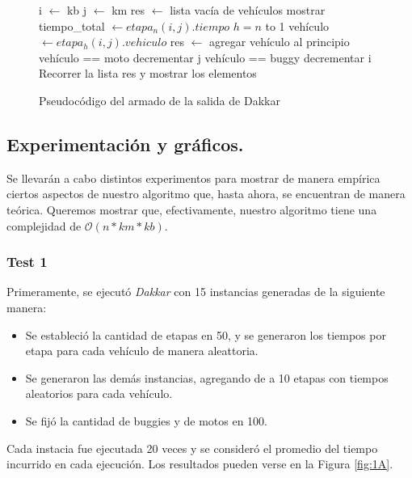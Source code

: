 \begin{figure}[!ht]
\begin{codebox}
\li i $\leftarrow$ kb
\li j $\leftarrow$ km
\li res $\leftarrow$ lista vacía de vehículos
\li mostrar tiempo_total $\leftarrow etapa_n(i,j).tiempo$
\li \For $h = n$ to 1
\li 		\Do 
			vehículo $\leftarrow etapa_h(i,j).vehiculo$
\li			res $\leftarrow$ agregar vehículo al principio
\li			\If vehículo == moto
\li				\Do decrementar j
\li 			\Else \If vehículo == buggy
\li					\Do decrementar i
					\End
			\End
		\End
\li Recorrer la lista res y mostrar los elementos
\end{codebox} 
\caption{Pseudocódigo del armado de la salida de Dakkar}\label{code:dakkar.salida}
\end{figure}

\vspace*{0.6cm}
\subsection{Experimentación y gráficos.}

\vspace*{0.3cm}

Se llevarán a cabo distintos experimentos para mostrar de manera empírica ciertos aspectos de nuestro algoritmo que, hasta ahora, se encuentran de manera teórica.  Queremos mostrar que, efectivamente, nuestro algoritmo tiene una complejidad de $\mathcal{O}(n*km*kb)$.

\subsubsection{Test 1}
\vspace*{0.3cm}
Primeramente, se ejecutó {\it Dakkar} con 15 instancias generadas de la siguiente manera:

\begin{itemize}
	\item Se estableció la cantidad de etapas en 50, y se generaron los tiempos por etapa para cada vehículo de manera aleattoria.
	\item Se generaron las demás instancias, agregando de a 10 etapas con tiempos aleatorios para cada vehículo.
	\item Se fijó la cantidad de buggies y de motos en 100.
\end{itemize}

Cada instacia fue ejecutada 20 veces y se consideró el promedio del tiempo incurrido en cada ejecución.  Los resultados pueden verse en la Figura \ref{fig:1A}.

